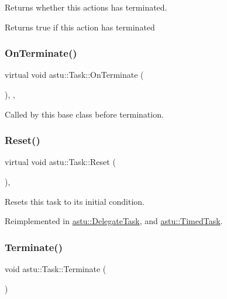 Returns whether this actions has terminated.

\begin{DoxyReturn}{Returns}
{\ttfamily true} if this action has terminated 
\end{DoxyReturn}
\mbox{\label{classastu_1_1Task_a7f0a9e45de3d302d52ef0ed13278ec94}} 
\subsubsection{\texorpdfstring{On\+Terminate()}{OnTerminate()}}
{\footnotesize\ttfamily virtual void astu\+::\+Task\+::\+On\+Terminate (\begin{DoxyParamCaption}{ }\end{DoxyParamCaption})\hspace{0.3cm}{\ttfamily [inline]}, {\ttfamily [protected]}, {\ttfamily [virtual]}}

Called by this base class before termination. \mbox{\label{classastu_1_1Task_af68025df1de6ad31882f0ccee5ccb100}} 
\subsubsection{\texorpdfstring{Reset()}{Reset()}}
{\footnotesize\ttfamily virtual void astu\+::\+Task\+::\+Reset (\begin{DoxyParamCaption}{ }\end{DoxyParamCaption})\hspace{0.3cm}{\ttfamily [inline]}, {\ttfamily [virtual]}}

Resets this task to its initial condition. 

Reimplemented in \hyperlink{classastu_1_1DelegateTask_a8bc7364937a4af2173e066174733e1d1}{astu\+::\+Delegate\+Task}, and \hyperlink{classastu_1_1TimedTask_ac885f7d65aab450125fc4e00eb045a82}{astu\+::\+Timed\+Task}.

\mbox{\label{classastu_1_1Task_a6b9160915de23077b54db896943f413f}} 
\subsubsection{\texorpdfstring{Terminate()}{Terminate()}}
{\footnotesize\ttfamily void astu\+::\+Task\+::\+Terminate (\begin{DoxyParamCaption}{ }\end{DoxyParamCaption})\hspace{0.3cm}{\ttfamily [inline]}}

